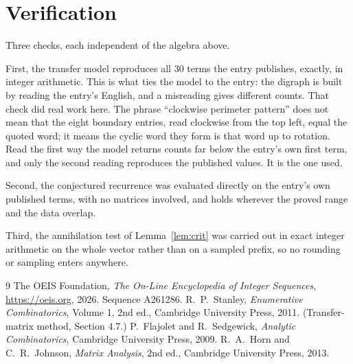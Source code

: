 \documentclass[11pt,a4paper]{article}
\theoremstyle{plain}
\theoremstyle{definition}
\begin{document}
\section{Verification}

Three checks, each independent of the algebra above.

First, the transfer model reproduces all $30$ terms the entry publishes, exactly, in
integer arithmetic. This is what ties the model to the entry: the digraph is built by reading
the entry's English, and a misreading gives different counts. That check did real work here. The phrase ``clockwise perimeter pattern'' does not mean that the eight boundary entries, read clockwise from the top left, equal the quoted word; it means the cyclic word they form is that word up to rotation. Read the first way the model returns counts far below the entry's own first term, and only the second reading reproduces the published values. It is the one used.

Second, the conjectured recurrence was evaluated directly on the entry's own published terms,
with no matrices involved, and holds wherever the proved range and the data overlap.

Third, the annihilation test of Lemma~\ref{lem:crit} was carried out in exact integer
arithmetic on the whole vector rather than on a sampled prefix, so no rounding or sampling
enters anywhere.

\begin{thebibliography}{9}
 The OEIS Foundation, \emph{The On-Line Encyclopedia of Integer
Sequences}, \url{https://oeis.org}, 2026. Sequence A261286.
 R.~P.~Stanley, \emph{Enumerative Combinatorics}, Volume 1, 2nd ed.,
Cambridge University Press, 2011. (Transfer-matrix method, Section 4.7.)
 P.~Flajolet and R.~Sedgewick, \emph{Analytic Combinatorics}, Cambridge
University Press, 2009.
 R.~A.~Horn and C.~R.~Johnson, \emph{Matrix Analysis}, 2nd ed., Cambridge
University Press, 2013.
\end{thebibliography}
\end{document}
